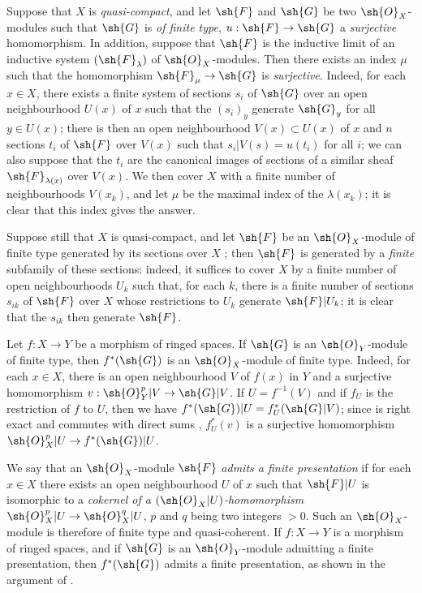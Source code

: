 \begin{env}[5.2.3]
\label{0.5.2.3}
Suppose that $X$ is \emph{quasi-compact}, and let $\sh{F}$ and $\sh{G}$ be two $\sh{O}_X$-modules such that $\sh{G}$ is \emph{of finite type}, $u:\sh{F}\to\sh{G}$ a \emph{surjective} homomorphism.
In addition, suppose that $\sh{F}$ is the inductive limit of an inductive system $(\sh{F}_\lambda)$ of $\sh{O}_X$-modules.
Then there exists an index $\mu$ such that the homomorphism $\sh{F}_\mu\to\sh{G}$ is \emph{surjective}.
Indeed, for each $x\in X$, there exists a finite system of sections $s_i$ of $\sh{G}$ over an open neighbourhood $U(x)$ of $x$ such that the $(s_i)_y$ generate $\sh{G}_y$ for all $y\in U(x)$;
there is then an open neighbourhood $V(x)\subset U(x)$ of $x$ and $n$ sections $t_i$ of $\sh{F}$ over $V(x)$ such that $s_i|V(s)=u(t_i)$ for all $i$;
we can also suppose that the $t_i$ are the canonical images of sections of a similar sheaf $\sh{F}_{\lambda(x)}$ over $V(x)$.
We then cover $X$ with a finite number of neighbourhoods $V(x_k)$, and let $\mu$ be the maximal index of the $\lambda(x_k)$;
it is clear that this index gives the answer.

Suppose still that $X$ is quasi-compact, and let $\sh{F}$ be an $\sh{O}_X$-module of finite type generated by its sections over $X$ ;
then $\sh{F}$ is generated by a \emph{finite} subfamily of these sections:
indeed, it suffices to cover $X$ by a finite number of open neighbourhoods $U_k$ such that, for each $k$, there is a finite number of sections $s_{ik}$ of $\sh{F}$ over $X$ whose restrictions to $U_k$ generate $\sh{F}|U_k$;
it is clear that the $s_{ik}$ then generate $\sh{F}$.
\end{env}

\begin{env}[5.2.4]
\label{0.5.2.4}
Let $f:X\to Y$ be a morphism of ringed spaces.
If $\sh{G}$ is an $\sh{O}_Y$-module of finite type, then $f^*(\sh{G})$ is an $\sh{O}_X$-module of finite type.
Indeed, for each $x\in X$, there is an open neighbourhood $V$ of $f(x)$ in $Y$ and a surjective homomorphism $v:\sh{O}_Y^p|V\to\sh{G}|V$.
If $U=f^{-1}(V)$ and if $f_U$ is the restriction of $f$ to $U$, then we have $f^*(\sh{G})|U=f_U^*(\sh{G}|V)$;
since  is right exact  and commutes with direct sums , $f_U^*(v)$ is a surjective homomorphism $\sh{O}_X^p|U\to f^*(\sh{G})|U$.
\end{env}

\begin{env}[5.2.5]
\label{0.5.2.5}
We say that an $\sh{O}_X$-module $\sh{F}$ \emph{admits a finite presentation} if for each $x\in X$ there exists an open neighbourhood $U$ of $x$ such that $\sh{F}|U$ is isomorphic to a \emph{cokernel of a $(\sh{O}_X|U)$-homomorphism $\sh{O}_X^p|U\to\sh{O}_X^q|U$}, $p$ and $q$ being two integers $>0$.
Such an $\sh{O}_X$-module is therefore of finite type and quasi-coherent.
If $f:X\to Y$ is a morphism of ringed spaces, and if $\sh{G}$ is an $\sh{O}_Y$-module admitting a finite presentation, then $f^*(\sh{G})$ admits a finite presentation, as shown in the argument of .
\end{env}

